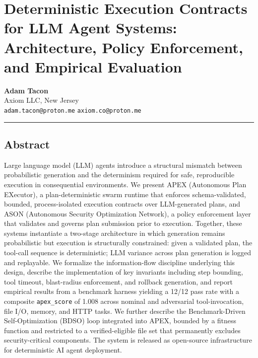 \section{Deterministic Execution Contracts for LLM Agent Systems:
Architecture, Policy Enforcement, and Empirical
Evaluation}\label{deterministic-execution-contracts-for-llm-agent-systems-architecture-policy-enforcement-and-empirical-evaluation}

\textbf{Adam Tacon}\\
Axiom LLC, New Jersey\\
\texttt{adam.tacon@proton.me} \texttt{axiom.co@proton.me}

\begin{center}\rule{0.5\linewidth}{0.5pt}\end{center}

\subsection{Abstract}\label{abstract}

Large language model (LLM) agents introduce a structural mismatch
between probabilistic generation and the determinism required for safe,
reproducible execution in consequential environments. We present APEX
(Autonomous Plan EXecutor), a plan-deterministic swarm runtime that
enforces schema-validated, bounded, process-isolated execution contracts
over LLM-generated plans, and ASON (Autonomous Security Optimization
Network), a policy enforcement layer that validates and governs plan
submission prior to execution. Together, these systems instantiate a
two-stage architecture in which generation remains probabilistic but
execution is structurally constrained: given a validated plan, the
tool-call sequence is deterministic; LLM variance across plan generation
is logged and replayable. We formalize the information-flow discipline
underlying this design, describe the implementation of key invariants
including step bounding, tool timeout, blast-radius enforcement, and
rollback generation, and report empirical results from a benchmark
harness yielding a 12/12 pass rate with a composite \texttt{apex\_score}
of 1.008 across nominal and adversarial tool-invocation, file I/O,
memory, and HTTP tasks. We further describe the Benchmark-Driven
Self-Optimization (BDSO) loop integrated into APEX, bounded by a fitness
function and restricted to a verified-eligible file set that permanently
excludes security-critical components. The system is released as
open-source infrastructure for deterministic AI agent deployment.

